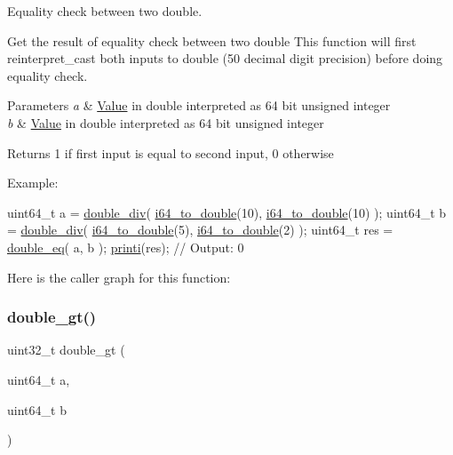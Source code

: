 Equality check between two double. 

Get the result of equality check between two double This function will first reinterpret\+\_\+cast both inputs to double (50 decimal digit precision) before doing equality check. 
\begin{DoxyParams}{Parameters}
{\em a} & \mbox{\hyperlink{struct_value}{Value}} in double interpreted as 64 bit unsigned integer \\
\hline
{\em b} & \mbox{\hyperlink{struct_value}{Value}} in double interpreted as 64 bit unsigned integer \\
\hline
\end{DoxyParams}
\begin{DoxyReturn}{Returns}
1 if first input is equal to second input, 0 otherwise
\end{DoxyReturn}
Example\+: 
\begin{DoxyCode}
uint64\_t a = \mbox{\hyperlink{group__mathcapi_gad67af06a6b0e9dbbf3be05d6bf99257c}{double\_div}}( \mbox{\hyperlink{group__mathcapi_gaec506d4ee77526e67ab5f2a8ef54f2b5}{i64\_to\_double}}(10), \mbox{\hyperlink{group__mathcapi_gaec506d4ee77526e67ab5f2a8ef54f2b5}{i64\_to\_double}}(10) );
uint64\_t b = \mbox{\hyperlink{group__mathcapi_gad67af06a6b0e9dbbf3be05d6bf99257c}{double\_div}}( \mbox{\hyperlink{group__mathcapi_gaec506d4ee77526e67ab5f2a8ef54f2b5}{i64\_to\_double}}(5), \mbox{\hyperlink{group__mathcapi_gaec506d4ee77526e67ab5f2a8ef54f2b5}{i64\_to\_double}}(2) );
uint64\_t res = \mbox{\hyperlink{group__mathcapi_ga8911bd5a24e0d8287d6b3d5a81500e6a}{double\_eq}}( a, b );
\mbox{\hyperlink{group__consolecapi_gaac924af668edbf421d478edf203fdbd1}{printi}}(res); \textcolor{comment}{// Output: 0}
\end{DoxyCode}
 Here is the caller graph for this function\+:
\mbox{\label{group__mathcapi_gab60e3f0c6651ad497f6665e032e39f6a}} 
\subsubsection{\texorpdfstring{double\+\_\+gt()}{double\_gt()}}
{\footnotesize\ttfamily uint32\+\_\+t double\+\_\+gt (\begin{DoxyParamCaption}\item[{uint64\+\_\+t}]{a,  }\item[{uint64\+\_\+t}]{b }\end{DoxyParamCaption})}



